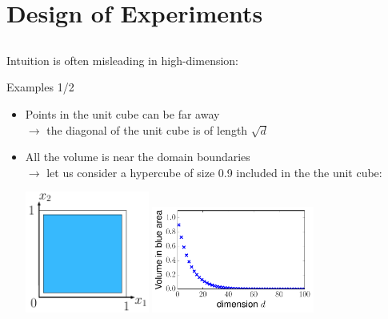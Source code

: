 \documentclass{beamer}
\begin{document}
\section[DoE]{Design of Experiments}
\subsection{}

\begin{frame}{}
Intuition is often misleading in high-dimension:
\begin{exampleblock}{Examples 1/2}
\begin{itemize}
	\item Points in the unit cube can be far away\\ \qquad $\rightarrow$ the diagonal of the unit cube is of length $\sqrt{d}$
	\item All the volume is near the domain boundaries \\ \qquad $\rightarrow$ let us consider a hypercube of size 0.9 included in the the unit cube:\vspace{5mm}
	\begin{center}
\includegraphics[height=4cm]{figures/latexdraw/volumedim} \quad
\includegraphics[height=3.5cm]{figures/python/spf_volume}
\end{center}
\end{itemize}
\end{exampleblock}
\end{frame}
\end{document}
